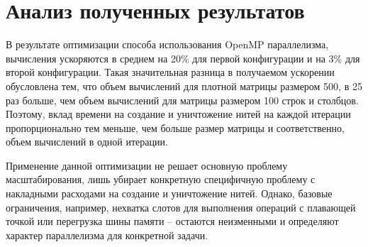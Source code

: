\documentclass[12pt, oneside, a4paper]{article}
\begin{document}
\section{Анализ полученных результатов}

В результате оптимизации способа использования OpenMP параллелизма, вычисления ускоряются в среднем на 20\% для первой конфигурации и на 3\% для второй конфигурации. Такая значительная разница в получаемом ускорении обусловлена тем, что объем вычислений для плотной матрицы размером 500, в 25 раз больше, чем объем вычислений для матрицы размером 100 строк и столбцов. Поэтому, вклад времени на создание и уничтожение нитей на каждой итерации пропорционально тем меньше, чем больше размер матрицы и соответственно, объем вычислений в одной итерации.

Применение данной оптимизации не решает основную проблему масштабирования, лишь убирает конкретную специфичную проблему с накладными расходами на создание и уничтожение нитей. Однако, базовые ограничения, например, нехватка слотов для выполнения операций с плавающей точкой или перегрузка шины памяти -- остаются неизменными и определяют характер параллелизма для конкретной задачи.
\end{document}
